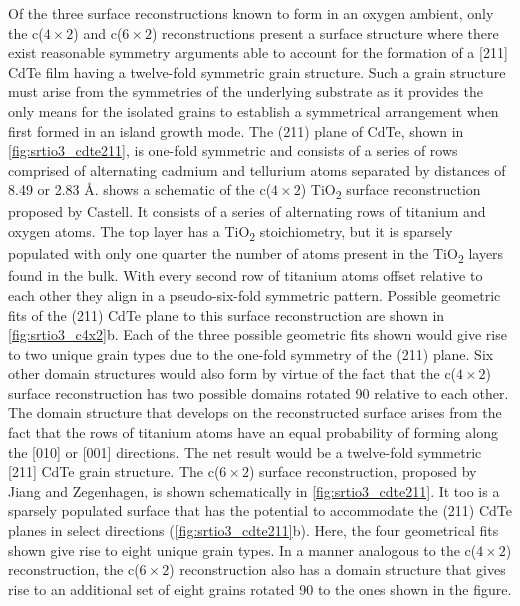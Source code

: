 Of the three surface reconstructions known to form in an oxygen ambient, only the c(\(4\times2\)) and c(\(6\times2\)) reconstructions present a surface structure where there exist reasonable symmetry arguments able to account for the formation of a [211] CdTe film having a twelve-fold symmetric grain structure.
Such a grain structure must arise from the symmetries of the underlying substrate as it provides the only means for the isolated grains to establish a symmetrical arrangement when first formed in an island growth mode.
The (211) plane of CdTe, shown in \cref{fig:srtio3_cdte211}, is one-fold symmetric and consists of a series of rows comprised of alternating cadmium and tellurium atoms separated by distances of 8.49 or 2.83 \AA\@.  shows a schematic of the c(\(4\times2\)) TiO\textsubscript{2} surface reconstruction proposed by Castell\cite{Castell2002}.
It consists of a series of alternating rows of titanium and oxygen atoms.
The top layer has a TiO\textsubscript{2} stoichiometry, but it is sparsely populated with only one quarter the number of atoms present in the TiO\textsubscript{2} layers found in the bulk\cite{Castell2002}.
With every second row of titanium atoms offset relative to each other they align in a pseudo-six-fold symmetric pattern.
Possible geometric fits of the (211) CdTe plane to this surface reconstruction are shown in \cref{fig:srtio3_c4x2}b.
Each of the three possible geometric fits shown would give rise to two unique grain types due to the one-fold symmetry of the (211) plane.
Six other domain structures would also form by virtue of the fact that the c(\(4\times2\)) surface reconstruction has two possible domains rotated 90\degree{} relative to each other\cite{Castell2002}.
The domain structure that develops on the reconstructed surface arises from the fact that the rows of titanium atoms have an equal probability of forming along the [010] or [001] directions.
The net result would be a twelve-fold symmetric [211] CdTe grain structure.
The c(\(6\times2\)) surface reconstruction, proposed by Jiang and Zegenhagen\cite{Jiang1996}, is shown schematically in \cref{fig:srtio3_cdte211}.
It too is a sparsely populated surface that has the potential to accommodate the (211) CdTe planes in select directions (\cref{fig:srtio3_cdte211}b).
Here, the four geometrical fits shown give rise to eight unique grain types.
In a manner analogous to the c(\(4\times2\)) reconstruction, the c(\(6\times2\)) reconstruction also has a domain structure that gives rise to an additional set of eight grains rotated 90\degree{} to the ones shown in the figure.
